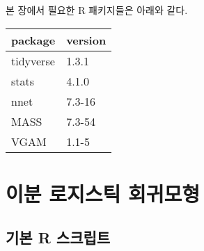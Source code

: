 \documentclass[
]{book}
\begin{document}
본 장에서 필요한 R 패키지들은 아래와 같다.

\begin{tabular}{l|l}
\hline
package & version\\
\hline
tidyverse & 1.3.1\\
\hline
stats & 4.1.0\\
\hline
nnet & 7.3-16\\
\hline
MASS & 7.3-54\\
\hline
VGAM & 1.1-5\\
\hline
\end{tabular}

\hypertarget{binary-logistic-regression}{%
\section{이분 로지스틱 회귀모형}\label{binary-logistic-regression}}

\hypertarget{bianry-logistic-reg-basic-script}{%
\subsection{기본 R 스크립트}\label{bianry-logistic-reg-basic-script}}
\end{document}
